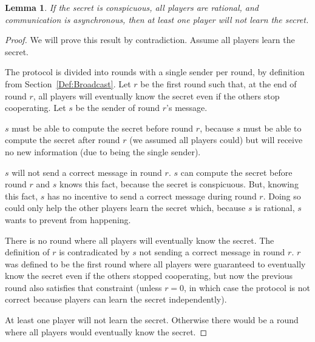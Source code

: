 \documentclass[12pt]{dalcsthesis}
\newtheorem{lemma}{Lemma}
\begin{document}
\begin{lemma}\label{Lem:Async:ConspicuousMustSacrifice}If the secret is conspicuous, all players are rational, and communication is asynchronous, then at least one player will not learn the secret.\end{lemma}
\begin{proof}
We will prove this result by contradiction. Assume all players learn the secret.

The protocol is divided into rounds with a single sender per round, by definition from Section~\ref{Def:Broadcast}. Let $r$ be the first round such that, at the end of round $r$, all players will eventually know the secret even if the others stop cooperating. Let $s$ be the sender of round $r$'s message.

$s$ must be able to compute the secret before round $r$, because $s$ must be able to compute the secret after round $r$ (we assumed all players could) but will receive no new information (due to being the single sender).

$s$ will not send a correct message in round $r$. $s$ can compute the secret before round $r$ and $s$ knows this fact, because the secret is conspicuous. But, knowing this fact, $s$ has no incentive to send a correct message during round $r$. Doing so could only help the other players learn the secret which, because $s$ is rational, $s$ wants to prevent from happening.

There is no round where all players will eventually know the secret. The definition of $r$ is contradicated by $s$ not sending a correct message in round $r$. $r$ was defined to be the first round where all players were guaranteed to eventually know the secret even if the others stopped cooperating, but now the previous round also satisfies that constraint (unless $r=0$, in which case the protocol is not correct because players can learn the secret independently).

At least one player will not learn the secret. Otherwise there would be a round where all players would eventually know the secret.
\end{proof}
\end{document}

